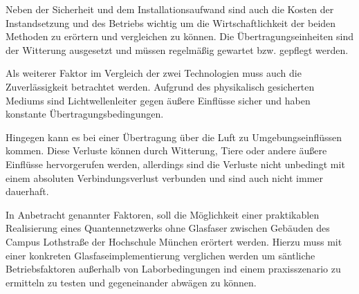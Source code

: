 Neben der Sicherheit und dem Installationsaufwand sind auch die Kosten der Instandsetzung und des Betriebs wichtig um die Wirtschaftlichkeit der beiden Methoden zu erörtern und vergleichen zu können.
Die Übertragungseinheiten sind der Witterung ausgesetzt und müssen regelmäßig gewartet bzw. gepflegt werden.

Als weiterer Faktor im Vergleich der zwei Technologien muss auch die Zuverlässigkeit betrachtet werden.
Aufgrund des physikalisch gesicherten Mediums sind Lichtwellenleiter gegen äußere Einflüsse sicher und haben konstante Übertragungsbedingungen.

Hingegen kann es bei einer Übertragung über die Luft zu Umgebungseinflüssen kommen.
Diese Verluste können durch Witterung, Tiere oder andere äußere Einflüsse hervorgerufen werden, allerdings sind die Verluste nicht unbedingt mit einem absoluten Verbindungsverlust verbunden und sind auch nicht immer dauerhaft.

In Anbetracht genannter Faktoren, soll die Möglichkeit einer praktikablen Realisierung eines Quantennetzwerks ohne Glasfaser zwischen Gebäuden des Campus Lothstraße der Hochschule München erörtert werden. Hierzu muss mit einer konkreten Glasfaseimplementierung verglichen werden um säntliche Betriebsfaktoren außerhalb von Laborbedingungen ind einem praxisszenario zu ermitteln zu testen und gegeneinander abwägen zu können.